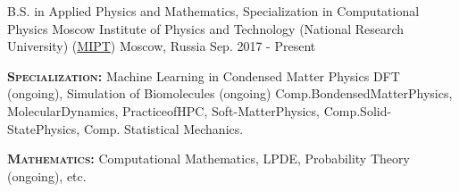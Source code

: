 

\begin{cventries}

  \cventry
    {B.S. in Applied Physics and Mathematics, Specialization in Computational Physics} %
    {Moscow Institute of Physics and Technology (National Research University) (\href{https://mipt.ru/english/}{MIPT})} %
    {Moscow, Russia} %
    {Sep. 2017 - Present} %
    {
      \begin{cvitems} %
        \item {\textsc{\textbf{Specialization:}} \hspace{5pt} \textsf{Machine Learning in Condensed Matter Physics} \hspace{10pt} \textsf{DFT (ongoing)}, \hspace{10pt} \textsf{Simulation of Biomolecules (ongoing)} \newline Comp.\hspace{2pt}Bondensed\hspace{2pt}Matter\hspace{2pt}Physics, \hspace{4pt} Molecular\hspace{2pt}Dynamics, \hspace{4pt} Practice\hspace{2pt}of\hspace{2pt}HPC, \hspace{4pt} Soft-Matter\hspace{2pt}Physics, \hspace{4pt} Comp.\hspace{2pt}Solid-State\hspace{2pt}Physics, \hspace{4pt} Comp. Statistical Mechanics.}
        \item {\textsc{\textbf{Mathematics:}} \hspace{5pt} Computational Mathematics, \hspace{10pt} LPDE, \hspace{10pt} Probability Theory (ongoing), \hspace{10pt} etc.}

\end{cvitems}}
\end{cventries}
